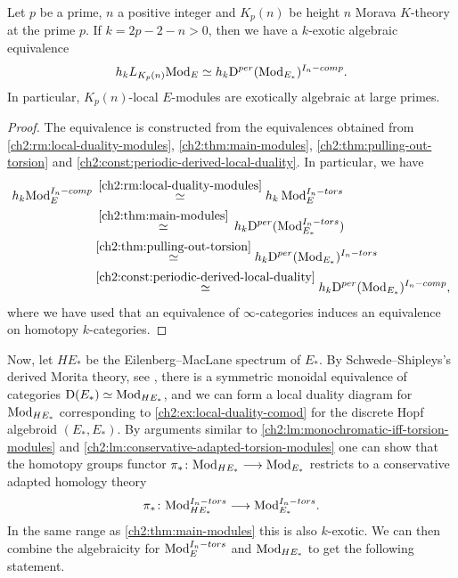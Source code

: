 \begin{corollary}
    \label{ch2:cor:main-modules-dual}
    Let $p$ be a prime, $n$ a positive integer and $K_p(n)$ be height $n$ Morava $K$-theory at the prime $p$. If $k=2p-2-n>0$, then we have a $k$-exotic algebraic equivalence 
    $$h_k L_{K_p(n)}\mathrm{Mod}_{E} \simeq h_k \mathrm{D}^{per}(\mathrm{Mod}_{E_*})^{I_n-comp}.$$ 
    In particular, $K_p(n)$-local $E$-modules are exotically algebraic at large primes. 
\end{corollary}
\begin{proof}
    The equivalence is constructed from the equivalences obtained from \cref{ch2:rm:local-duality-modules}, \cref{ch2:thm:main-modules}, \cref{ch2:thm:pulling-out-torsion} and \cref{ch2:const:periodic-derived-local-duality}. In particular, we have
    \begin{align*}
        h_k \mathrm{Mod}_{E}^{I_n-comp}
        &\hspace{2pt}\overset{\ref{ch2:rm:local-duality-modules}}\simeq 
        h_k \hspace{2pt} \mathrm{Mod}_{E}^{I_n-tors} \\
        &\hspace{2pt}\overset{\ref{ch2:thm:main-modules}}\simeq 
        \hspace{2pt} h_k \mathrm{D}^{per}(\mathrm{Mod}_{E_*}^{I_n-tors}) \\
        &\overset{\ref{ch2:thm:pulling-out-torsion}}\simeq
        h_k \mathrm{D}^{per}(\mathrm{Mod}_{E_*})^{I_n-tors} \\
        &\overset{\ref{ch2:const:periodic-derived-local-duality}}\simeq 
        h_k \mathrm{D}^{per}(\mathrm{Mod}_{E_*})^{I_n-comp},
    \end{align*}
    where we have used that an equivalence of $\infty$-categories induces an equivalence on homotopy $k$-categories.
\end{proof}

Now, let $HE_*$ be the Eilenberg--MacLane spectrum of $E_*$. By Schwede--Shipleys's derived Morita theory, see \cite[7.1.1.16]{Lurie_HA}, there is a symmetric monoidal equivalence of categories $\mathrm{D}(E_*)\simeq \mathrm{Mod}_{HE_*}$, and we can form a local duality diagram for $\mathrm{Mod}_{HE_*}$ corresponding to \cref{ch2:ex:local-duality-comod} for the discrete Hopf algebroid $(E_*, E_*)$. By arguments similar to \cref{ch2:lm:monochromatic-iff-torsion-modules} and \cref{ch2:lm:conservative-adapted-torsion-modules} one can show that the homotopy groups functor $\pi_*\colon \mathrm{Mod}_{HE_*}\longrightarrow \mathrm{Mod}_{E_*}$ restricts to a conservative adapted homology theory 
$$\pi_* \colon \mathrm{Mod}_{HE_*}^{I_n-tors}\longrightarrow \mathrm{Mod}_{E_*}^{I_n-tors}.$$
In the same range as \cref{ch2:thm:main-modules} this is also $k$-exotic. We can then combine the algebraicity for $\mathrm{Mod}_{E}^{I_n-tors}$ and $\mathrm{Mod}_{HE_*}$ to get the following statement. 

